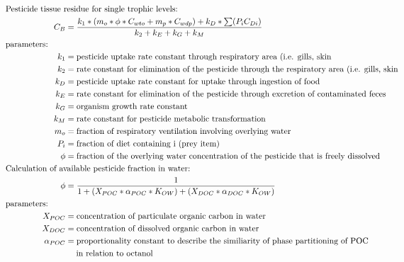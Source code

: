 \documentclass[10pt]{article}
\begin{document}
\begin{align}
&    \hspace{-1.0in}  \text{Pesticide tissue residue for single trophic levels:} \nonumber \\
C_{B} & = \frac{k_{1} * (m_{o}*\phi*C_{wto} +m_{p}*C_{wdp})+k_{D}*\sum(P_{i}C_{Di})}{k_{2}+k_{E}+k_{G}+k_{M}} \nonumber \\
&    \hspace{-1.0in}  \text{parameters:} \nonumber \\
k_{1} & = \text{pesticide uptake rate constant through respiratory area (i.e. gills, skin} \nonumber \\
k_{2} & = \text{rate constant for elimination of the pesticide through the respiratory area (i.e. gills, skin} \nonumber \\
k_{D} & = \text{pesticide uptake rate constant for uptake through ingestion of food} \nonumber\\
k_{E} & = \text{rate constant for elimination of the pesticide through excretion of contaminated feces} \nonumber \\
k_{G} & = \text{organism growth rate constant} \nonumber \\
k_{M} & = \text{rate constant for pesticide metabolic transformation} \nonumber \\
m_{o} & = \text{fraction of respiratory ventilation involving overlying water} \nonumber \\
P_{i} & = \text{fraction of diet containing i (prey item)} \nonumber \\
\phi & = \text{fraction of the overlying water concentration of the pesticide that is freely dissolved} \nonumber \\
\vspace{0.5in}
&    \hspace{-1.0in}  \text{Calculation of available pesticide fraction in water:} \nonumber \\ 
\phi & = \frac{1}{1+(X_{POC}*\alpha_{POC}*K_{OW})+(X_{DOC}*\alpha_{DOC}*K_{OW})} \nonumber \\
&    \hspace{-1.0in}  \text{parameters:} \nonumber \\
X_{POC} & = \text{concentration of particulate organic carbon in water} \nonumber \\
X_{DOC} & = \text{concentration of dissolved organic carbon in water} \nonumber \\
\alpha_{POC} & = \text{proportionality constant to describe the similiarity of phase partitioning of POC}\nonumber\\ &\hspace{1.3em} \text{in relation to octanol}\nonumber\\

\end{align}
\end{document}
